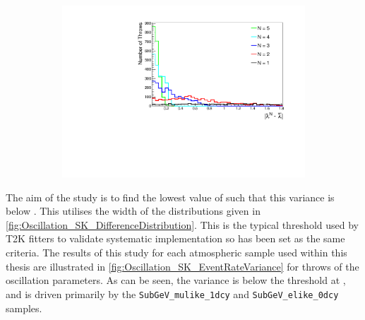\begin{figure}[h]                                                                                                                                                                                          
  \begin{subfigure}[t]{\textwidth}
    \includegraphics[width=\textwidth, trim={0mm 0mm 0mm 0mm}, clip,page=1]{Figures/Oscillation/DifferenceInEventRateToMean.pdf}
  \end{subfigure}
  \caption{}
  \label{fig:Oscillation_SK_DifferenceDistribution}
\end{figure}


The aim of the study is to find the lowest value of  such that this variance is below . This utilises the width of the distributions given in \autoref{fig:Oscillation_SK_DifferenceDistribution}. This is the typical threshold used by T2K fitters to validate systematic implementation so has been set as the same criteria. The results of this study for each atmospheric sample used within this thesis are illustrated in \autoref{fig:Oscillation_SK_EventRateVariance} for  throws of the oscillation parameters. As can be seen, the variance is below the threshold at , and is driven primarily by the \texttt{SubGeV\_mulike\_1dcy} and \texttt{SubGeV\_elike\_0dcy} samples.


